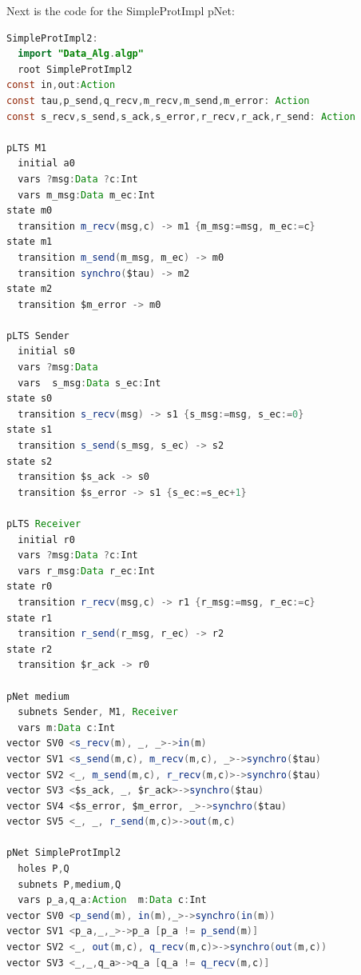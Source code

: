 \documentclass{lmcs}
\begin{document}
Next is the code for the SimpleProtImpl pNet:
\medskip
\begin{lstlisting}[basicstyle=\scriptsize\ttfamily, language=java, frame=single]
SimpleProtImpl2:
  import "Data_Alg.algp"
  root SimpleProtImpl2
const in,out:Action
const tau,p_send,q_recv,m_recv,m_send,m_error: Action
const s_recv,s_send,s_ack,s_error,r_recv,r_ack,r_send: Action

pLTS M1
  initial a0
  vars ?msg:Data ?c:Int
  vars m_msg:Data m_ec:Int
state m0
  transition m_recv(msg,c) -> m1 {m_msg:=msg, m_ec:=c}
state m1
  transition m_send(m_msg, m_ec) -> m0 
  transition synchro($tau) -> m2
state m2
  transition $m_error -> m0

pLTS Sender
  initial s0
  vars ?msg:Data
  vars  s_msg:Data s_ec:Int
state s0
  transition s_recv(msg) -> s1 {s_msg:=msg, s_ec:=0}
state s1
  transition s_send(s_msg, s_ec) -> s2 
state s2
  transition $s_ack -> s0
  transition $s_error -> s1 {s_ec:=s_ec+1}

pLTS Receiver
  initial r0
  vars ?msg:Data ?c:Int
  vars r_msg:Data r_ec:Int
state r0
  transition r_recv(msg,c) -> r1 {r_msg:=msg, r_ec:=c}
state r1
  transition r_send(r_msg, r_ec) -> r2
state r2
  transition $r_ack -> r0

pNet medium
  subnets Sender, M1, Receiver
  vars m:Data c:Int
vector SV0 <s_recv(m), _, _>->in(m)
vector SV1 <s_send(m,c), m_recv(m,c), _>->synchro($tau)
vector SV2 <_, m_send(m,c), r_recv(m,c)>->synchro($tau)
vector SV3 <$s_ack, _, $r_ack>->synchro($tau)
vector SV4 <$s_error, $m_error, _>->synchro($tau)
vector SV5 <_, _, r_send(m,c)>->out(m,c)

pNet SimpleProtImpl2
  holes P,Q
  subnets P,medium,Q
  vars p_a,q_a:Action  m:Data c:Int
vector SV0 <p_send(m), in(m),_>->synchro(in(m))
vector SV1 <p_a,_,_>->p_a [p_a != p_send(m)]
vector SV2 <_, out(m,c), q_recv(m,c)>->synchro(out(m,c))
vector SV3 <_,_,q_a>->q_a [q_a != q_recv(m,c)]
\end{lstlisting}

\end{document}
